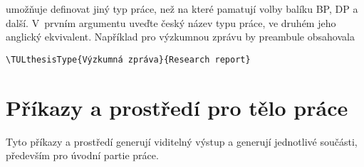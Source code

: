 \documentclass[FM,DP]{tulthesis}
\newcommand{\argument}[1]{{\ttfamily\color{\tulcolor}#1}}
\newcommand{\prikaz}[1]{\argument{\textbackslash #1}}
\newenvironment{myquote}{\begin{list}{}{\setlength\leftmargin\parindent}\item[]}{\end{list}}
\newenvironment{listing}{\begin{myquote}\color{\tulcolor}}{\end{myquote}}
\begin{document}
\begin{description}
\item[\prikaz{TULthesisType\{\emph{typ práce česky}\}\{\emph{anglicky}\}}]
umožňuje definovat jiný typ práce, než na které pamatují volby balíku
\argument{BP}, \argument{DP} a další. V~prvním argumentu uveďte český
název typu práce, ve druhém jeho anglický ekvivalent. Například pro výzkumnou
zprávu by preambule obsahovala

\begin{listing}
\begin{verbatim}
\TULthesisType{Výzkumná zpráva}{Research report}
\end{verbatim}
\end{listing}

\end{description}


\section{Příkazy a prostředí pro tělo práce}

Tyto příkazy a prostředí generují viditelný výstup a generují jednotlivé
součásti, především pro úvodní partie práce.
\end{document}
